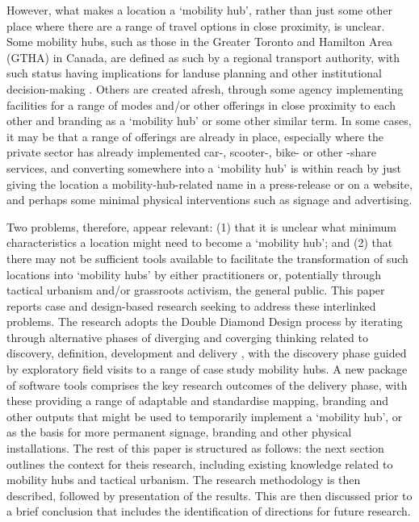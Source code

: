 \documentclass[preprint, 3p,
authoryear]{elsarticle} %
\begin{document}
However, what makes a location a `mobility hub', rather than just some
other place where there are a range of travel options in close
proximity, is unclear. Some mobility hubs, such as those in the Greater
Toronto and Hamilton Area (GTHA) in Canada, are defined as such by a
regional transport authority, with such status having implications for
landuse planning and other institutional decision-making
\cite{Salsberg:2010aa, Engel-Yan:2012aa}. Others are created afresh,
through some agency implementing facilities for a range of modes and/or
other offerings in close proximity to each other and branding as a
`mobility hub' or some other similar term. In some cases, it may be that
a range of offerings are already in place, especially where the private
sector has already implemented car-, scooter-, bike- or other -share
services, and converting somewhere into a `mobility hub' is within reach
by just giving the location a mobility-hub-related name in a
press-release or on a website, and perhaps some minimal physical
interventions such as signage and advertising.

Two problems, therefore, appear relevant: (1) that it is unclear what
minimum characteristics a location might need to become a `mobility
hub'; and (2) that there may not be sufficient tools available to
facilitate the transformation of such locations into `mobility hubs' by
either practitioners or, potentially through tactical urbanism and/or
grassroots activism, the general public. This paper reports case and
design-based research seeking to address these interlinked problems. The
research adopts the Double Diamond Design process by iterating through
alternative phases of diverging and coverging thinking related to
discovery, definition, development and delivery
\cite{UK-Design-Council:0aa}, with the discovery phase guided by
exploratory field visits to a range of case study mobility hubs. A new
package of software tools comprises the key research outcomes of the
delivery phase, with these providing a range of adaptable and
standardise mapping, branding and other outputs that might be used to
temporarily implement a `mobility hub', or as the basis for more
permanent signage, branding and other physical installations. The rest
of this paper is structured as follows: the next section outlines the
context for theis research, including existing knowledge related to
mobility hubs and tactical urbanism. The research methodology is then
described, followed by presentation of the results. This are then
discussed prior to a brief conclusion that includes the identification
of directions for future research.
\end{document}
